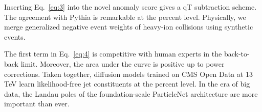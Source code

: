 Inserting Eq.~\eqref{eq:3} into the novel anomaly score gives a qT
subtraction scheme. The agreement with Pythia is remarkable at the
percent level. Physically, we merge generalized negative event weights
of heavy-ion collisions using synthetic events.

The first term in Eq.~\eqref{eq:4} is competitive with human experts in
the back-to-back limit. Moreover, the area under the curve is positive
up to power corrections. Taken together, diffusion models trained on CMS
Open Data at 13 TeV learn likelihood-free jet constituents at the
percent level. In the era of big data, the Landau poles of the
foundation-scale ParticleNet architecture are more important than ever.

